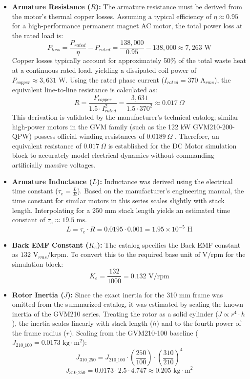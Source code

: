 \documentclass[
bindingoffset=5mm,  %
footnoteindent=3mm, %
hyphenation=true    %
]{src/wut-thesis}
\begin{document}
	\begin{itemize}
		\item \textbf{Armature Resistance ($R$):} The armature resistance must be derived from the motor's thermal copper losses. Assuming a typical efficiency of $\eta \approx 0.95$ for a high-performance permanent magnet AC motor, the total power loss at the rated load is:
		$$P_{loss} = \frac{P_{rated}}{\eta} - P_{rated} = \frac{138,000}{0.95} - 138,000 \approx 7,263 \text{ W}$$
		Copper losses typically account for approximately 50\% of the total waste heat at a continuous rated load, yielding a dissipated coil power of $P_{copper} \approx 3,631 \text{ W}$. Using the rated phase current ($I_{rated} = 370 \text{ A}_{rms}$), the equivalent line-to-line resistance is calculated as:
		$$R = \frac{P_{copper}}{1.5 \cdot I_{rated}^2} = \frac{3,631}{1.5 \cdot 370^2} \approx 0.017 \ \Omega$$
		This derivation is validated by the manufacturer's technical catalog; similar high-power motors in the GVM family (such as the 122 kW GVM210-200-QPW) possess official winding resistances of $0.0189 \ \Omega$ \cite{parker_gvm_small}. Therefore, an equivalent resistance of $0.017 \ \Omega$ is established for the DC Motor simulation block to accurately model electrical dynamics without commanding artificially massive voltages.
		
		\item \textbf{Armature Inductance ($L$):} Inductance was derived using the electrical time constant ($\tau_e = \frac{L}{R}$). Based on the manufacturer's engineering manual, the time constant for similar motors in this series scales slightly with stack length. Interpolating for a 250 mm stack length yields an estimated time constant of $\tau_e \approx 19.5 \text{ ms}$.
		$$L = \tau_e \cdot R = 0.0195 \cdot 0.001 = 1.95 \times 10^{-5} \text{ H}$$
		
		\item \textbf{Back EMF Constant ($K_e$):} The catalog specifies the Back EMF constant as $132 \text{ V}_{rms}/\text{krpm}$. To convert this to the required base unit of $\text{V/rpm}$ for the simulation block:
		$$K_e = \frac{132}{1000} = 0.132 \text{ V/rpm}$$
		
		\item \textbf{Rotor Inertia ($J$):} Since the exact inertia for the 310 mm frame was omitted from the summarized catalog, it was estimated by scaling the known inertia of the GVM210 series. Treating the rotor as a solid cylinder ($J \propto r^4 \cdot h$), the inertia scales linearly with stack length ($h$) and to the fourth power of the frame radius ($r$). Scaling from the GVM210-100 baseline ($J_{210\_100} = 0.0173 \text{ kg}\cdot\text{m}^2$):
		$$J_{310\_250} = J_{210\_100} \cdot \left(\frac{250}{100}\right) \cdot \left(\frac{310}{210}\right)^4$$
		$$J_{310\_250} = 0.0173 \cdot 2.5 \cdot 4.747 \approx 0.205 \text{ kg}\cdot\text{m}^2$$
		

\end{itemize}
\end{document}
